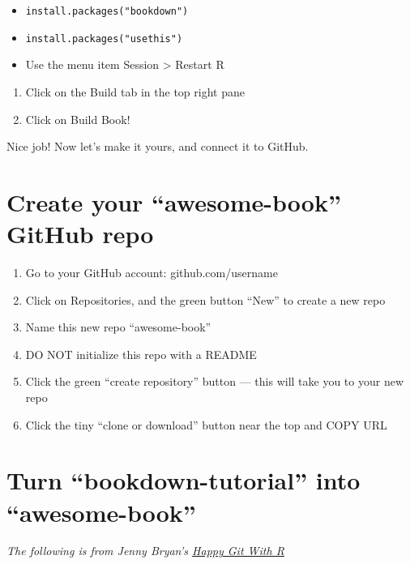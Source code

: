 \documentclass[
]{book}
\providecommand{\tightlist}{%
  \setlength{\itemsep}{0pt}\setlength{\parskip}{0pt}}
\theoremstyle{definition}
\theoremstyle{definition}
\theoremstyle{definition}
\theoremstyle{remark}
\begin{document}
\begin{itemize}
\tightlist
\item
  \texttt{install.packages("bookdown")}~\\
\item
  \texttt{install.packages("usethis")}~\\
\item
  Use the menu item Session \textgreater{} Restart R\\
\end{itemize}

\begin{enumerate}
\def\labelenumi{\arabic{enumi}.}
\tightlist
\item
  Click on the Build tab in the top right pane
\item
  Click on Build Book!
\end{enumerate}

Nice job! Now let's make it yours, and connect it to GitHub.

\hypertarget{create-your-awesome-book-github-repo}{%
\section{Create your ``awesome-book'' GitHub repo}\label{create-your-awesome-book-github-repo}}

\begin{enumerate}
\def\labelenumi{\arabic{enumi}.}
\tightlist
\item
  Go to your GitHub account: github.com/username
\item
  Click on Repositories, and the green button ``New'' to create a new repo
\item
  Name this new repo ``awesome-book''
\item
  DO NOT initialize this repo with a README
\item
  Click the green ``create repository'' button --- this will take you to your new repo
\item
  Click the tiny ``clone or download'' button near the top and COPY URL
\end{enumerate}

\hypertarget{turn-bookdown-tutorial-into-awesome-book}{%
\section{Turn ``bookdown-tutorial'' into ``awesome-book''}\label{turn-bookdown-tutorial-into-awesome-book}}

\emph{The following is from Jenny Bryan's \href{https://happygitwithr.com/existing-github-last.html}{Happy Git With R}}
\end{document}

